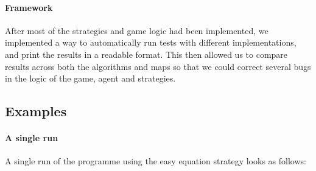 \documentclass[british]{article}
\begin{document}
\paragraph{Framework} After most of the strategies and game logic had been implemented, we implemented a way to automatically run tests with different implementations, and print the results in a readable format. This then allowed us to compare results across both the algorithms and maps so that we could correct several bugs in the logic of the game, agent and strategies.

\subsection{Examples}
\label{example}
\paragraph{A single run} A single run of the programme using the easy equation strategy looks as follows:
\end{document}
